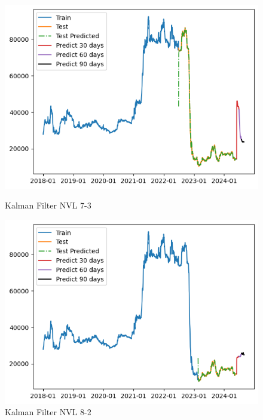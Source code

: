 \documentclass[conference]{IEEEtran}
\begin{document}
\begin{enumerate}
\begin{figure}[htbp]
    \begin{minipage}{0.23\textwidth}
    \centering
    \includegraphics[width=1\textwidth]{experiment/kf/NVL 7-3.png}
    \caption{Kalman Filter NVL 7-3}
    \label{fig:nvl_boxplot}
    \end{minipage}
    \hfill
    \begin{minipage}{0.23\textwidth}
    \centering
    \includegraphics[width=1\textwidth]{experiment/kf/NVL 8-2.png}
    \caption{Kalman Filter NVL 8-2}
    \label{fig:nvl_histogram}
    \end{minipage}
    \begin{minipage}{0.23\textwidth}
    \centering

\end{minipage}
\end{figure}
\end{enumerate}
\end{document}
